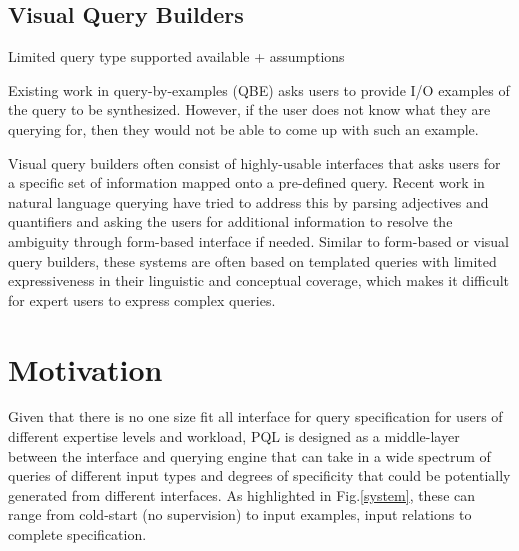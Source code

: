 \documentclass{sig-alternate-05-2015}
\begin{document}
\subsection{Visual Query Builders}
Limited query type supported available + assumptions
\par Existing work in query-by-examples (QBE) asks users to provide I/O examples of the query to be synthesized\cite{Wang2017a,Wang2017}. However, if the user does not know what they are querying for, then they would not be able to come up with such an example. 
\par Visual query builders often consist of highly-usable interfaces that asks users for a specific set of information mapped onto a pre-defined query. Recent work in natural language querying have tried to address this by parsing adjectives and quantifiers and asking the users for additional information to resolve the ambiguity through form-based interface if needed. Similar to form-based or visual query builders\cite{Abouzied2012}, these systems are often based on templated queries with limited expressiveness in their linguistic and conceptual coverage, which makes it difficult for expert users to express complex queries. 
\cite{Jin2017}
\section{Motivation}
\par Given that there is no one size fit all interface for query specification for users of different expertise levels and workload, PQL is designed as a middle-layer between the interface and querying engine that can take in a wide spectrum of queries of different input types and degrees of specificity that could be potentially generated from different interfaces. As highlighted in Fig.\ref{system}, these can range from cold-start (no supervision) to input examples, input relations to complete specification.
\end{document}
